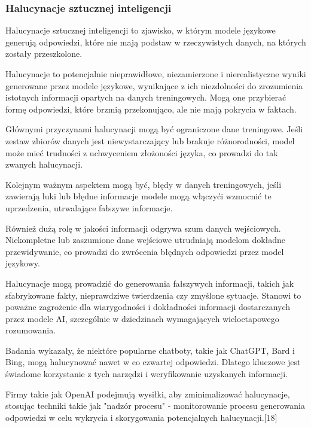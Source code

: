 \subsubsection{Halucynacje sztucznej inteligencji}
Halucynacje sztucznej inteligencji to zjawisko, w którym modele językowe generują odpowiedzi, które nie mają podstaw w rzeczywistych danych, na których zostały przeszkolone.

Halucynacje to potencjalnie nieprawidłowe, niezamierzone i nierealistyczne wyniki generowane przez modele językowe, wynikające z ich niezdolności do zrozumienia istotnych informacji opartych na danych treningowych. Mogą one przybierać formę odpowiedzi, które brzmią przekonująco, ale nie mają pokrycia w faktach.

Głównymi przyczynami halucynacji mogą być ograniczone dane treningowe. Jeśli zestaw zbiorów danych jest niewystarczający lub brakuje różnorodności, model może mieć trudności z uchwyceniem złożoności języka, co prowadzi do tak zwanych halucynacji.

Kolejnym ważnym aspektem mogą być, błędy w danych treningowych, jeśli zawierają luki lub błędne informacje modele mogą włączyć\linebreak i wzmocnić te uprzedzenia, utrwalające fałszywe informacje.

Również dużą rolę w jakości informacji odgrywa szum danych wejściowych. Niekompletne lub zaszumione dane wejściowe utrudniają modelom dokładne przewidywanie, co prowadzi do zwrócenia błędnych odpowiedzi przez model językowy.

Halucynacje mogą prowadzić do generowania fałszywych informacji, takich jak sfabrykowane fakty, nieprawdziwe twierdzenia czy zmyślone sytuacje. Stanowi to poważne zagrożenie dla wiarygodności i dokładności informacji dostarczanych przez modele AI, szczególnie w dziedzinach wymagających wieloetapowego rozumowania.

Badania wykazały, że niektóre popularne chatboty, takie jak ChatGPT, Bard i Bing, mogą halucynować nawet w co czwartej odpowiedzi. Dlatego kluczowe jest świadome korzystanie z tych narzędzi i weryfikowanie uzyskanych informacji.

Firmy takie jak OpenAI podejmują wysiłki, aby zminimalizować halucynacje, stosując techniki takie jak "nadzór procesu" - monitorowanie procesu generowania odpowiedzi w celu wykrycia i skorygowania potencjalnych halucynacji.[18]

